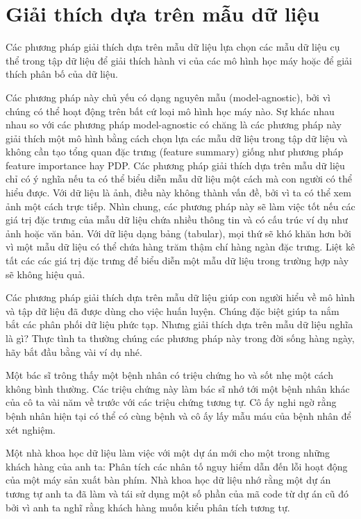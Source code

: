 \chapter{Giải thích dựa trên mẫu dữ liệu}

Các phương pháp giải thích dựa trên mẫu dữ liệu lựa chọn các mẫu dữ liệu cụ thể trong tập dữ liệu để giải thích hành vi của các mô hình học máy hoặc để giải thích phân bố của dữ liệu.

Các phương pháp này chủ yếu có dạng nguyên mẫu (model-agnostic), bởi vì chúng có thể hoạt động trên bất cứ loại mô hình học máy nào. Sự khác nhau nhau so với các phương pháp model-agnostic có chăng là các phương pháp này giải thích một mô hình bằng cách chọn lựa các mẫu dữ liệu trong tập dữ liệu và không cần tạo tổng quan đặc trưng (feature summary) giống như phương pháp feature importance hay PDP. Các phương pháp giải thích dựa trên mẫu dữ liệu chỉ có ý nghĩa nếu ta có thể biểu diễn mẫu dữ liệu một cách mà con người có thể hiểu được. Với dữ liệu là ảnh, điều này không thành vấn đề, bởi vì ta có thể xem ảnh một cách trực tiếp. Nhìn chung, các phương pháp này sẽ làm việc tốt nếu các giá trị đặc trưng của mẫu dữ liệu chứa nhiều thông tin và có cấu trúc ví dụ như ảnh hoặc văn bản. Với dữ liệu dạng bảng (tabular), mọi thứ sẽ khó khăn hơn bởi vì một mẫu dữ liệu có thể chứa hàng trăm thậm chí hàng ngàn đặc trưng. Liệt kê tất các các giá trị đặc trưng để biểu diễn một mẫu dữ liệu trong trường hợp này sẽ không hiệu quả.

Các phương pháp giải thích dựa trên mẫu dữ liệu giúp con người hiểu về mô hình và tập dữ liệu đã được dùng cho việc huấn luyện. Chúng đặc biệt giúp ta nắm bắt các phân phối dữ liệu phức tạp. Nhưng giải thích dựa trên mẫu dữ liệu nghĩa là gì? Thực tình ta thường chúng các phương pháp này trong đời sống hàng ngày, hãy bắt đầu bằng vài ví dụ nhé.

Một bác sĩ trông thấy một bệnh nhân có triệu chứng ho và sốt nhẹ một cách không bình thường. Các triệu chứng này làm bác sĩ nhớ tới một bệnh nhân khác của cô ta vài năm về trước với các triệu chứng tương tự. Cô ấy nghi ngờ rằng bệnh nhân hiện tại có thể có cùng bệnh và cô ấy lấy mẫu máu của bệnh nhân để xét nghiệm.

Một nhà khoa học dữ liệu làm việc với một dự án mới cho một trong những khách hàng của anh ta: Phân tích các nhân tố nguy hiểm dẫn đến lỗi hoạt động của một máy sản xuất bàn phím. Nhà khoa học dữ liệu nhớ rằng một dự án tương tự anh ta đã làm và tái sử dụng một số phần của mã code từ dự án cũ đó bởi vì anh ta nghĩ rằng khách hàng muốn kiểu phân tích tương tự.

